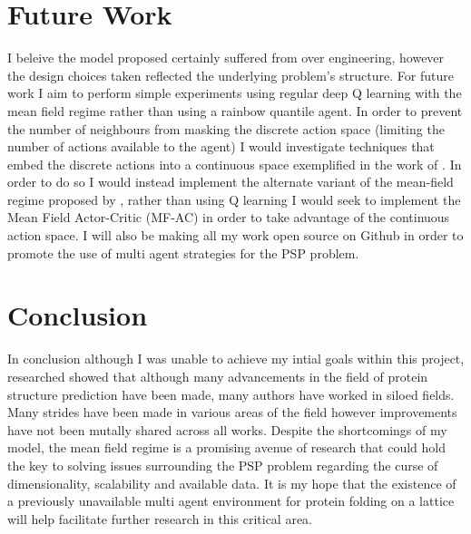 \section{Future Work}
I beleive the model proposed certainly suffered from over engineering, however
the design choices taken reflected the underlying problem's structure. For future 
work I aim to perform simple experiments using regular deep Q learning with the 
mean field regime rather than using a rainbow quantile agent. In order to prevent
the number of neighbours from masking the discrete action space (limiting the number
of actions available to the agent) I would investigate techniques that embed the discrete
actions into a continuous space exemplified in the work of \cite{Gabriel2015}. In order
to do so I would instead implement the alternate variant of the mean-field regime
proposed by \cite{Yang2018}, rather than using Q learning I would seek to implement
the Mean Field Actor-Critic (MF-AC) in order to take advantage of the continuous 
action space. I will also be making all my work open source on Github in order
to promote the use of multi agent strategies for the PSP problem.

\section{Conclusion}
In conclusion although I was unable to achieve my intial goals within this project,
researched showed that although many advancements
in the field of protein structure prediction have been made, many
authors have worked in siloed fields. Many strides have been made in various areas of the 
field however improvements have not been mutally shared across all works.
Despite the shortcomings of my model, the mean field regime is a promising
avenue of research that could hold the key to solving issues surrounding
the PSP problem regarding the curse of dimensionality, scalability and 
available data. It is my hope that the existence of a 
previously unavailable multi agent environment
for protein folding on a lattice will help
facilitate further research in this critical area.